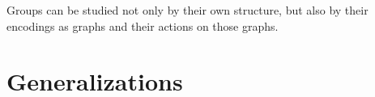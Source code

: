 \documentclass[12pt]{article}
\begin{document}
\begin{idea}
 Groups can be studied not only by their own structure, but also by their
 encodings as graphs and their actions on those graphs.   
\end{idea}

%

\noindent {}

\section{Generalizations}
\end{document}
